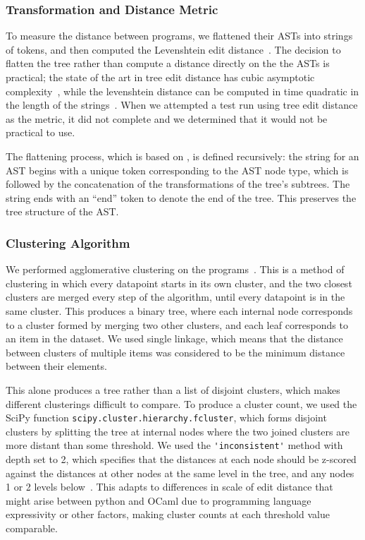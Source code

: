 \documentclass[conference]{IEEEtran}
\newcommand\lt[1]{{\lstinline|#1|}}
\begin{document}
\subsubsection{Transformation and Distance Metric}

To measure the distance between programs, we flattened their ASTs into strings
of tokens, and then computed the Levenshtein edit distance~\cite{levenshtein}.
The decision to flatten the tree rather than compute a distance directly on the
the ASTs is practical; the state of the art in tree edit distance has cubic
asymptotic complexity~\cite{PAWLIK2016157}, while the levenshtein distance can be
computed in time quadratic in the length of the strings~\cite{lev-quadratic}.
When we attempted a test run using tree edit distance as the metric, it did not
complete and we determined that it would not be practical to use.

The flattening process, which is based on \cite{dist-site}, is defined
recursively: the string for an AST
begins with a unique token corresponding to the AST node type, which is
followed by the concatenation of the transformations of the tree's subtrees.
The string ends with an ``end'' token to denote the end of the tree. This
preserves the tree structure of the AST.

\subsubsection{Clustering Algorithm}

We performed agglomerative clustering on the programs~\cite{modern-clustering}.
This is a method of clustering in which every datapoint starts in its own
cluster, and the two closest clusters are merged every step of the algorithm,
until every datapoint is in the same cluster. This produces a binary tree, where
each internal node corresponds to a cluster formed by merging two other clusters,
and each leaf corresponds to an item in the dataset. We used single linkage,
which means that the distance between clusters of multiple items was considered
to be the minimum distance between their elements.

This alone produces a tree rather than a list of disjoint clusters, which makes
different clusterings difficult to compare. To produce a cluster count, we used
the SciPy function \lt{scipy.cluster.hierarchy.fcluster}, which forms disjoint
clusters by splitting the tree at internal nodes where the two joined clusters
are more distant than some threshold. We used the \lt{'inconsistent'} method with
depth set to 2, which specifies that the distances at each node should be
z-scored against the distances at other nodes at the same level in the tree, and
any nodes 1 or 2 levels below~\cite{inconsistent}. This adapts to differences in
scale of edit distance that might arise between python and OCaml due to
programming language expressivity or other factors, making cluster counts at each
threshold value comparable.
\end{document}
